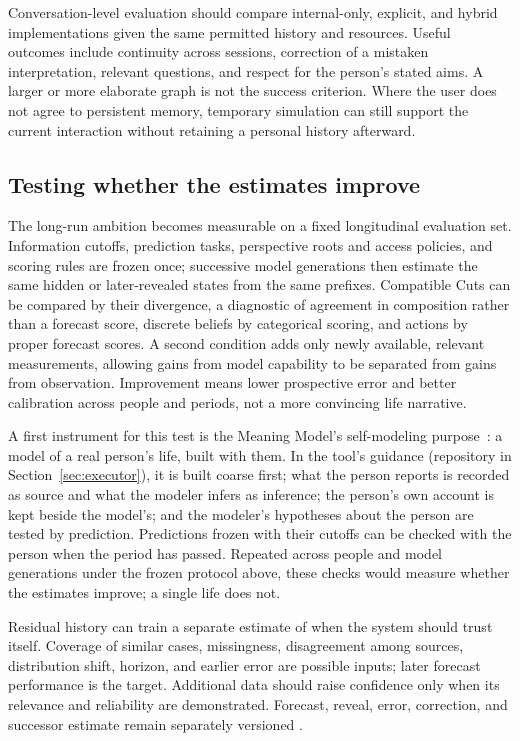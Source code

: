 \documentclass[10pt]{article}
\begin{document}
Conversation-level evaluation should compare internal-only, explicit, and
hybrid implementations given the same permitted history and resources. Useful
outcomes include continuity across sessions, correction of a mistaken
interpretation, relevant questions, and respect for the person's stated aims.
A larger or more elaborate graph is not the success criterion. Where the user
does not agree to persistent memory, temporary simulation can still support
the current interaction without retaining a personal history afterward.

\subsection{Testing whether the estimates improve}

The long-run ambition becomes measurable on a fixed longitudinal evaluation
set. Information cutoffs, prediction tasks, perspective roots and access
policies, and scoring rules are
frozen once; successive model generations then estimate the same hidden or
later-revealed states from the same prefixes. Compatible Cuts can be compared
by their divergence, a diagnostic of agreement in composition rather than a
forecast score, discrete beliefs by categorical scoring, and actions
by proper forecast scores. A second condition adds only newly available,
relevant measurements, allowing gains from model capability to be separated
from gains from observation. Improvement means lower prospective error and
better calibration across people and periods, not a more convincing life
narrative.

A first instrument for this test is the Meaning Model's self-modeling
purpose~\cite{westerbergMeaning2026}: a model of a real person's life, built
with them. In the tool's guidance (repository in Section~\ref{sec:executor}),
it is built coarse first; what the person reports is recorded as source and
what the modeler infers as inference; the person's own account is kept beside
the model's; and the modeler's hypotheses about the person are tested by
prediction. Predictions frozen with their cutoffs can be checked with the
person when the period has passed. Repeated across people and model
generations under the frozen protocol above, these checks would measure
whether the estimates improve; a single life does not.

Residual history can train a separate estimate of when the system should trust
itself. Coverage of similar cases, missingness, disagreement among sources,
distribution shift, horizon, and earlier error are possible inputs; later
forecast performance is the target. Additional data should raise confidence
only when its relevance and reliability are demonstrated. Forecast, reveal,
error, correction, and successor estimate remain separately versioned
\cite{gneitingRaftery2007,tashman2000}.
\end{document}

